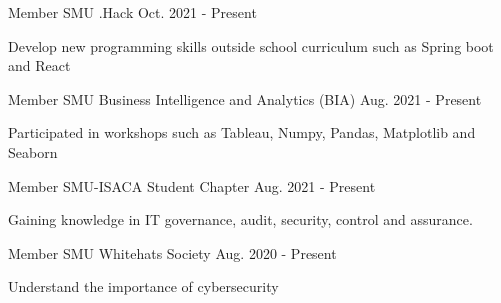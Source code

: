 

\begin{cventries}

    \cventry
    {Member} %
    {SMU .Hack} %
    {Oct. 2021 - Present} %
    {} 
    {
      \begin{cvitems} %
        \item {Develop new programming skills outside school curriculum such as Spring boot and React}
      \end{cvitems}
    }
    
    \cventry
    {Member} %
    {SMU Business Intelligence and Analytics (BIA)} %
    {Aug. 2021 - Present} %
    {} 
    {
      \begin{cvitems} %
        \item {Participated in workshops such as Tableau, Numpy, Pandas, Matplotlib and Seaborn}
      \end{cvitems}
    }

    \cventry
    {Member} %
    {SMU-ISACA Student Chapter} %
    {Aug. 2021 - Present} %
    {} 
    {
      \begin{cvitems} %
        \item {Gaining knowledge in IT governance, audit, security, control and assurance.}
      \end{cvitems}
    }

    \cventry
    {Member} %
    {SMU Whitehats Society} %
    {Aug. 2020 - Present} %
    {} 
    {
      \begin{cvitems} %
        \item {Understand the importance of cybersecurity}
      \end{cvitems}
    }


\end{cventries}
